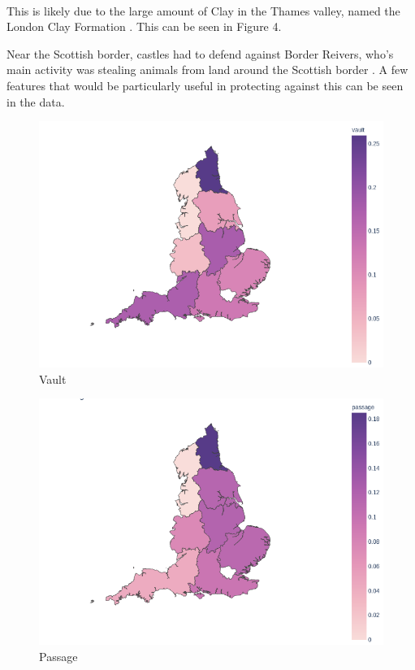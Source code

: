 \documentclass[11pt]{article}
\begin{document}
\vspace{1cm}
\\
This is likely due to the large amount of Clay in the Thames valley, named the London Clay Formation \cite{sumbler1996london}. This can be seen in Figure 4.

Near the Scottish border, castles had to defend against Border Reivers, who's main activity was stealing animals from land around the Scottish border \cite{moffat2011reivers}. A few features that would be particularly useful in protecting against this can be seen in the data.

\begin{minipage}{0.45\textwidth}
	\begin{figure}[H]
		\centering
		\includegraphics[width=\textwidth]{vault.png}
		\caption{Vault}
	\end{figure}
\end{minipage}
\begin{minipage}{0.45\textwidth}
	\begin{figure}[H]
		\centering
		\includegraphics[width=\textwidth]{passage.png}
		\caption{Passage}
	\end{figure}
\end{minipage}
\end{document}

